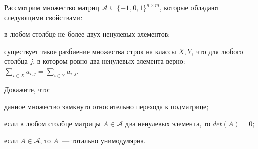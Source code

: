 Рассмотрим множество матриц $\mathcal{A} \subseteq \{-1, 0, 1\}^{n \times m}$, которые обладают следующими свойствами:
\begin{itemtask}
    \item в любом столбце не более двух ненулевых элементов;
    \item существует такое разбиение множества строк на классы $X, Y$, что для любого столбца $j$, в котором ровно два
	    ненулевых элемента верно: $\sum\limits_{i \in X}{a_{i, j}} = \sum\limits_{i \in Y}{a_{i, j}}$.
\end{itemtask}
    
Докажите, что:
\begin{enumcyr}
	\item данное множество замкнуто относительно перехода к подматрице;
    \item если в любом столбце матрицы $A \in \mathcal{A}$ два ненулевых элемента, то $det(A) = 0$;
    \item если $A \in \mathcal{A}$, то $A$~--- тотально унимодулярна.
\end{enumcyr}
